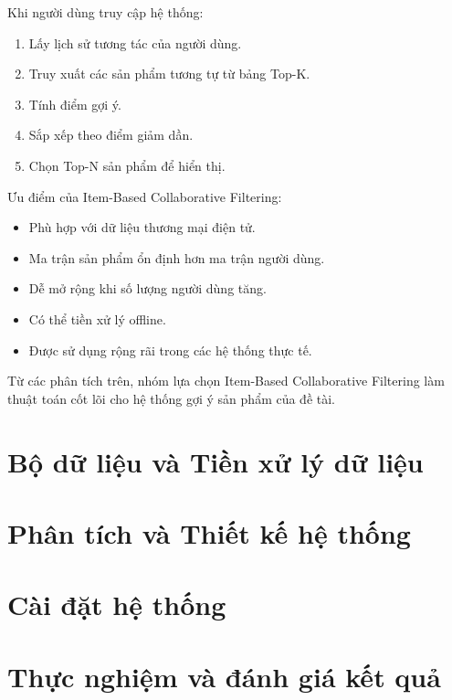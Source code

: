 \documentclass{report}
\begin{document}
Khi người dùng truy cập hệ thống:

\begin{enumerate}
\item Lấy lịch sử tương tác của người dùng.
\item Truy xuất các sản phẩm tương tự từ bảng Top-K.
\item Tính điểm gợi ý.
\item Sắp xếp theo điểm giảm dần.
\item Chọn Top-N sản phẩm để hiển thị.
\end{enumerate}

Ưu điểm của Item-Based Collaborative Filtering:

\begin{itemize}
\item Phù hợp với dữ liệu thương mại điện tử.
\item Ma trận sản phẩm ổn định hơn ma trận người dùng.
\item Dễ mở rộng khi số lượng người dùng tăng.
\item Có thể tiền xử lý offline.
\item Được sử dụng rộng rãi trong các hệ thống thực tế.
\end{itemize}

Từ các phân tích trên, nhóm lựa chọn Item-Based Collaborative Filtering làm thuật toán cốt lõi cho hệ thống gợi ý sản phẩm của đề tài.


\chapter{Bộ dữ liệu và Tiền xử lý dữ liệu}
\label{chap:dulieu}

\chapter{Phân tích và Thiết kế hệ thống}
\label{chap:phantichvathietke}

\chapter{Cài đặt hệ thống}
\label{chap:caidat}

\chapter{Thực nghiệm và đánh giá kết quả}
\label{chap:thucnghiem}
\end{document}
